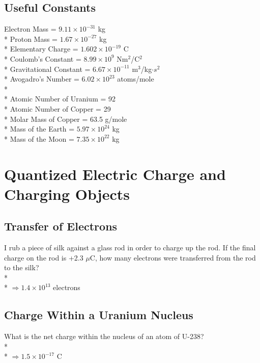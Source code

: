 \documentclass[11pt]{article}
\begin{document}
\maketitle
\tableofcontents
\vspace{50pt}

\subsection*{Useful Constants}
Electron Mass = $9.11 \times 10^{-31}$ kg \\*
Proton Mass = $1.67 \times 10^{-27}$ kg \\*
Elementary Charge = $1.602 \times 10^{-19}$ C \\*
Coulomb's Constant = $8.99 \times 10^9$ Nm$^2$/C$^2$ \\*
Gravitational Constant = $6.67 \times 10^{-11}$ m$^3$/kg$\cdot s^2$ \\*
Avogadro's Number = $ 6.02 \times 10^{23}$ atoms/mole \\*\\*
Atomic Number of Uranium = 92 \\*
Atomic Number of Copper = 29 \\*
Molar Mass of Copper = 63.5 g/mole \\*
Mass of the Earth = $5.97 \times 10^{24}$ kg\\*
Mass of the Moon = $7.35 \times 10^{22}$ kg


\pagebreak
\section{Quantized Electric Charge and Charging Objects}
\vspace{10pt}

\subsection{Transfer of Electrons}
I rub a piece of silk against a glass rod in order to charge up the rod.  If the final charge on the rod is +2.3 $\mu$C, how many electrons were transferred from the rod to the silk? \\* \\*
$\Rightarrow 1.4 \times 10^{13}$ electrons

\subsection{Charge Within a Uranium Nucleus}
What is the net charge within the nucleus of an atom of U-238? \\* \\*
$\Rightarrow 1.5 \times 10^{-17}$ C
\end{document}
